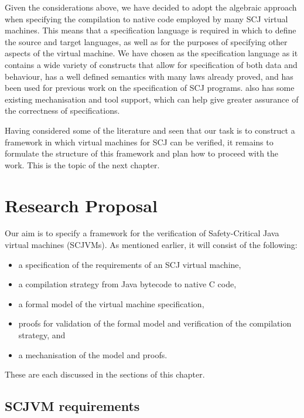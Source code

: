 \documentclass[a4paper,10pt]{report}
\begin{document}
Given the considerations above, we have decided to adopt the algebraic approach
when specifying the compilation to native code employed by many SCJ virtual
machines.  This means that a specification language is required in which to
define the source and target languages, as well as for the purposes of
specifying other aspects of the virtual machine.  We have chosen \Circus{} as
the specification language as it contains a wide variety of constructs that
allow for specification of both data and behaviour, has a well defined semantics
with many laws already proved, and has been used for previous work on the
specification of SCJ programs. \Circus{} also has some existing mechanisation
and tool support, which can help give greater assurance of the correctness of
specifications.

Having considered some of the literature and seen that our task is to construct
a framework in which virtual machines for SCJ can be verified, it remains to
formulate the structure of this framework and plan how to proceed with the
work.  This is the topic of the next chapter.

\chapter{Research Proposal}
\label{research-proposal-chapter}


Our aim is to specify a framework for the verification of Safety-Critical Java
virtual machines (SCJVMs).  As mentioned earlier, it will consist of the
following:  
\begin{itemize}
\item a specification of the requirements of an SCJ virtual machine,
\item a compilation strategy from Java bytecode to native C code,
\item a formal model of the virtual machine specification,
\item proofs for validation of the formal model and verification of the
  compilation strategy, and
\item a mechanisation of the model and proofs.
\end{itemize}
These are each discussed in the sections of this chapter.

\section{SCJVM requirements}
\end{document}
